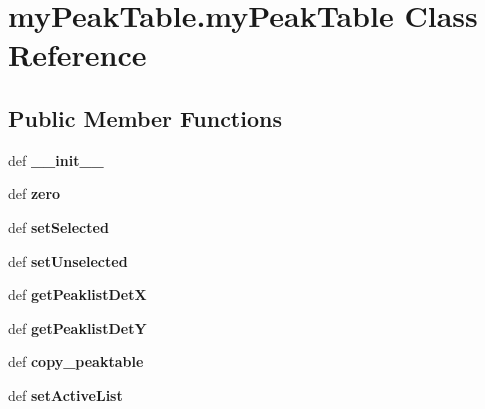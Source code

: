 \hypertarget{classmyPeakTable_1_1myPeakTable}{\section{my\-Peak\-Table.\-my\-Peak\-Table Class Reference}
\label{classmyPeakTable_1_1myPeakTable}
}
\subsection*{Public Member Functions}
\begin{DoxyCompactItemize}
\item 
\hypertarget{classmyPeakTable_1_1myPeakTable_af91b0ff7c386b74e34eaadf5228fc89c}{def {\bfseries \-\_\-\-\_\-init\-\_\-\-\_\-}}\label{classmyPeakTable_1_1myPeakTable_af91b0ff7c386b74e34eaadf5228fc89c}

\item 
\hypertarget{classmyPeakTable_1_1myPeakTable_ae353c401abe1c75d8cffeb5277615d70}{def {\bfseries zero}}\label{classmyPeakTable_1_1myPeakTable_ae353c401abe1c75d8cffeb5277615d70}

\item 
\hypertarget{classmyPeakTable_1_1myPeakTable_a8171aa9d50a86f7483d840ad094f77c5}{def {\bfseries set\-Selected}}\label{classmyPeakTable_1_1myPeakTable_a8171aa9d50a86f7483d840ad094f77c5}

\item 
\hypertarget{classmyPeakTable_1_1myPeakTable_aa543910f172ce15483e4753d848a296e}{def {\bfseries set\-Unselected}}\label{classmyPeakTable_1_1myPeakTable_aa543910f172ce15483e4753d848a296e}

\item 
\hypertarget{classmyPeakTable_1_1myPeakTable_aecda5256aaa268233ca76fc9aa31ea57}{def {\bfseries get\-Peaklist\-Det\-X}}\label{classmyPeakTable_1_1myPeakTable_aecda5256aaa268233ca76fc9aa31ea57}

\item 
\hypertarget{classmyPeakTable_1_1myPeakTable_ae754776fe2219a19ea8421154ec97c83}{def {\bfseries get\-Peaklist\-Det\-Y}}\label{classmyPeakTable_1_1myPeakTable_ae754776fe2219a19ea8421154ec97c83}

\item 
\hypertarget{classmyPeakTable_1_1myPeakTable_ab5033bca2519e7d553ff31abffe31b45}{def {\bfseries copy\-\_\-peaktable}}\label{classmyPeakTable_1_1myPeakTable_ab5033bca2519e7d553ff31abffe31b45}

\item 
\hypertarget{classmyPeakTable_1_1myPeakTable_a2632e23b330621bc8c0db28f103b6f4b}{def {\bfseries set\-Active\-List}}\label{classmyPeakTable_1_1myPeakTable_a2632e23b330621bc8c0db28f103b6f4b}


\end{DoxyCompactItemize}
